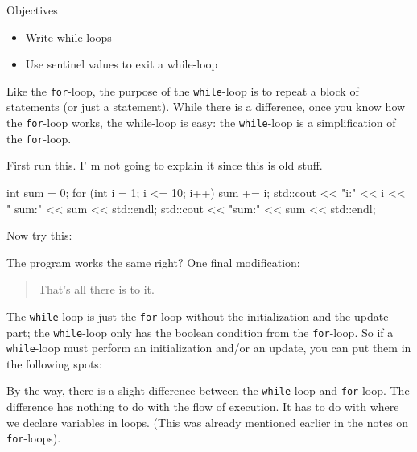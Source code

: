 \newpage{}

Objectives

\begin{itemize}
\item
  Write while-loops
\item
  Use sentinel values to exit a while-loop
\end{itemize}

Like the \texttt{for}-loop, the purpose of the \texttt{while}-loop is to
repeat a block of statements (or just a statement). While there is a
difference, once you know how the \texttt{for}-loop works, the while-loop
is easy: the \texttt{while}-loop is a simplification of the
\texttt{for}-loop.

\newpage{}

First run this. I' m not going to explain it since this
is old stuff.
\begin{console}
int sum = 0;
for (int i = 1; i <= 10; i++)
{   
    sum += i;
    std::cout << "i:" << i << " sum:" << sum
              << std::endl;
}
std::cout << "sum:" << sum << std::endl;
\end{console}
Now try this:
The program works the same right? One final modification:
\begin{quote}
That's all there is to it.
\end{quote}

\begin{quote}
\end{quote}

The \texttt{while}-loop is just the \texttt{for}-loop without the
initialization and the update part; the \texttt{while}-loop only has the
boolean condition from the \texttt{for}-loop. So if a \texttt{while}-loop
must perform an initialization and/or an update, you can put them in the
following spots:
By the way, there is a slight difference between the \texttt{while}-loop
and \texttt{for}-loop. The difference has nothing to do with the flow of
execution. It has to do with where we declare variables in loops. (This
was already mentioned earlier in the notes on \texttt{for}-loops).

